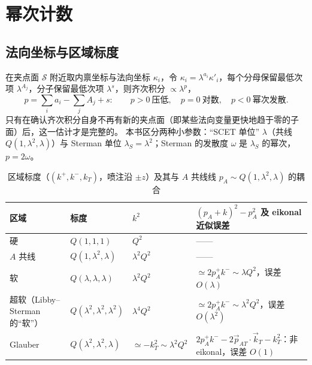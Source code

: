 \section{幂次计数}
\label{sec:powercount}

\subsection{法向坐标与区域标度}

在夹点面 $\mathcal S$ 附近取内禀坐标与法向坐标 $\kappa_i$，令 $\kappa_i=\lambda^{a_i}\kappa'_i$，每个分母保留最低次项 $\lambda^{A_j}$，分子保留最低次项
$\lambda^{s}$，则齐次积分 $\propto\lambda^{p}$，
\begin{equation}\label{eq:pc-generic}
p=\sum_ia_i-\sum_jA_j+s:\qquad p>0\ \text{压低},\quad p=0\ \text{对数},\quad p<0\ \text{幂次发散}.
\end{equation}
只有在确认齐次积分自身不再有新的夹点面（即某些法向变量更快地趋于零的子面）后，这一估计才是完整的。
本书区分两种小参数：“SCET 单位” $\lambda$（共线 $Q(1,\lambda^2,\lambda)$）与 Sterman 单位 $\lambda_S=\lambda^2$；Sterman 的发散度 $\omega$ 是
$\lambda_S$ 的幂次，$p=2\omega$。

\begin{table}[htbp]\centering\small
\caption{区域标度（$(k^+,k^-,k_T)$，喷注沿 $\pm z$）及其与 $A$ 共线线 $p_A\sim Q(1,\lambda^2,\lambda)$ 的耦合}
\label{tab:pc-modes}
\begin{tabularx}{\textwidth}{@{}>{\raggedright\arraybackslash}p{3.3cm}ll>{\raggedright\arraybackslash}X@{}}\toprule
区域 & 标度 & $k^2$ & $(p_A+k)^2-p_A^2$ 及 eikonal 近似误差\\\midrule
硬 & $Q(1,1,1)$ & $Q^2$ & ——\\
$A$ 共线 & $Q(1,\lambda^2,\lambda)$ & $\lambda^2Q^2$ & ——\\
软 & $Q(\lambda,\lambda,\lambda)$ & $\lambda^2Q^2$ & $\simeq2p_A^+k^-\sim\lambda Q^2$，误差 $O(\lambda)$\\
超软（Libby--Sterman 的“软”） & $Q(\lambda^2,\lambda^2,\lambda^2)$ & $\lambda^4Q^2$ & $\simeq2p_A^+k^-\sim\lambda^2Q^2$，误差 $O(\lambda^2)$\\
Glauber & $Q(\lambda^2,\lambda^2,\lambda)$ & $\simeq-k_T^2\sim\lambda^2Q^2$ & $2p_A^+k^--2\vec p_{AT}\!\cdot\!\vec k_T-k_T^2$：非 eikonal，误差 $O(1)$\\\bottomrule
\end{tabularx}
\end{table}

